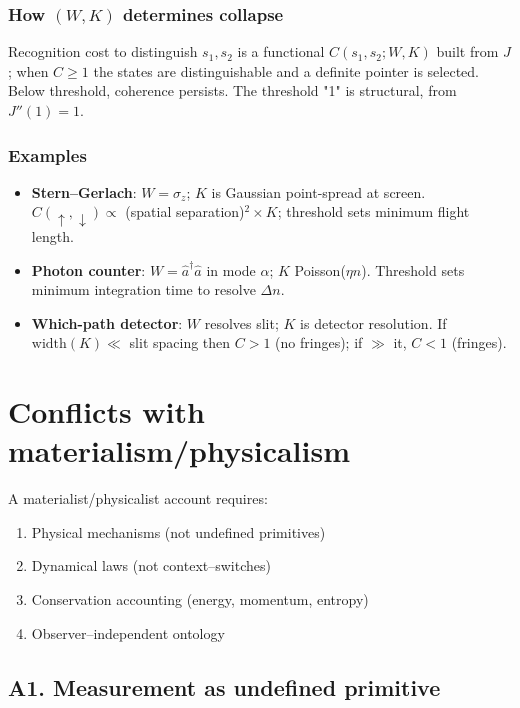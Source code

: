 \documentclass[11pt]{article}
\begin{document}
\subsubsection*{How $(W,K)$ determines collapse}
Recognition cost to distinguish $s_1,s_2$ is a functional $C(s_1,s_2;W,K)$ built from $J$; when $C\!\ge\!1$ the states are distinguishable and a definite pointer is selected. Below threshold, coherence persists. The threshold "1" is structural, from $J''(1)=1$.

\subsubsection*{Examples}
\begin{itemize}[leftmargin=*]
  \item \textbf{Stern--Gerlach}: $W\!=\!\sigma_z$; $K$ is Gaussian point-spread at screen. $C(\uparrow,\downarrow)\propto$ (spatial separation)$^2\times K$; threshold sets minimum flight length.
  \item \textbf{Photon counter}: $W\!=\!\hat a^\dagger\hat a$ in mode $\alpha$; $K$ Poisson($\eta n$). Threshold sets minimum integration time to resolve $\Delta n$.
  \item \textbf{Which-path detector}: $W$ resolves slit; $K$ is detector resolution. If $\text{width}(K)\!\ll$ slit spacing then $C\!>\!1$ (no fringes); if $\gg$ it, $C\!<\!1$ (fringes).
\end{itemize}

\section{Conflicts with materialism/physicalism}

A materialist/physicalist account requires:
\begin{enumerate}[nosep]
  \item Physical mechanisms (not undefined primitives)
  \item Dynamical laws (not context--switches)
  \item Conservation accounting (energy, momentum, entropy)
  \item Observer--independent ontology
\end{enumerate}

\subsection{A1. Measurement as undefined primitive}
\end{document}
